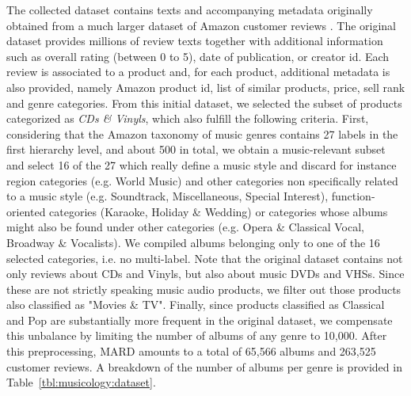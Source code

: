 The collected dataset contains texts and accompanying metadata originally obtained from a much larger dataset of Amazon customer reviews \citep{McAuley2015a,McAuley2015}. The original dataset provides millions of review texts together with additional information such as overall rating (between 0 to 5), date of publication, or creator id. Each review is associated to a product and, for each product, additional metadata is also provided, namely Amazon product id, list of similar products, price, sell rank and genre categories. From this initial dataset, we selected the subset of products categorized as \textit{CDs \& Vinyls}, which also fulfill the following criteria. First, considering that the Amazon taxonomy of music genres contains 27 labels in the first hierarchy level, and about 500 in total, we obtain a music-relevant subset and select 16 of the 27 which really define a music style and discard for instance region categories (e.g. World Music) and other categories non specifically related to a music style (e.g. Soundtrack, Miscellaneous, Special Interest), function-oriented categories (Karaoke, Holiday \& Wedding) or categories whose albums might also be found under other categories (e.g. Opera \& Classical Vocal, Broadway \& Vocalists). We compiled albums belonging only to one of the 16 selected categories, i.e. no multi-label. Note that the original dataset contains not only reviews about CDs and Vinyls, but also about music DVDs and VHSs. Since these are not strictly speaking music audio products, we filter out those products also classified as "Movies \& TV". Finally, since products classified as Classical and Pop are substantially more frequent in the original dataset, we compensate this unbalance by limiting the number of albums of any genre to 10,000. After this preprocessing, MARD amounts to a total of 65,566 albums and 263,525 customer reviews. A breakdown of the number of albums per genre is provided in Table~\ref{tbl:musicology:dataset}.

